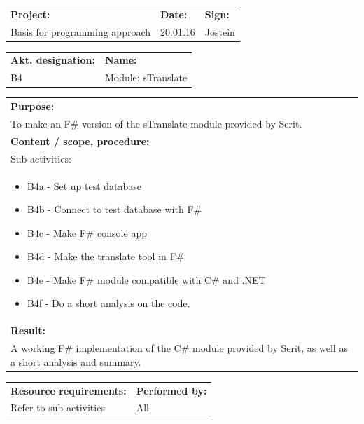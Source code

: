 \documentclass[12pt, a4paper]{article}
\begin{document}
\newpage

\begin{tabularx}{\textwidth}{|X|p{32mm}|p{20mm}|}
	\hline
	\textbf{Project:}&\textbf{Date:}&\textbf{Sign:}\\
	Basis for programming approach&20.01.16&Jostein\\
	\hline
\end{tabularx}

\begin{tabularx}{\textwidth}{|p{40mm}|X|}
	\textbf{Akt. designation:}&\textbf{Name:}\\
	B4&Module: sTranslate \\
	\hline
\end{tabularx}

\begin{tabularx}{\textwidth}{|X|}
	\textbf{Purpose:}\\
	To make an F\# version of the sTranslate module provided by Serit.\\
	\hline
	\textbf{Content / scope, procedure:}\\
	Sub-activities:\\
	\begin{itemize}[noitemsep,topsep=0pt]
		\item B4a - Set up test database
		\item B4b - Connect to test database with F\#
		\item B4c - Make F\# console app
		\item B4d - Make the translate tool in F\#
		\item B4e - Make F\# module compatible with C\# and .NET
		\item B4f - Do a short analysis on the code.


	\end{itemize}\\
 	\hline
	\textbf{Result:}\\
	A working F\# implementation of the C\# module provided by Serit, as well as a short analysis and summary.\\
	\hline
\end{tabularx}

\begin{tabularx}{\textwidth}{|X|p{30mm}|}
	\textbf{Resource requirements:}&\textbf{Performed by:}\\
	 Refer to sub-activities&All\\
	\hline
\end{tabularx}
\end{document}
